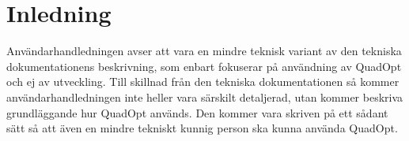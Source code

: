\section{Inledning}
Användarhandledningen avser att vara en mindre teknisk variant av den tekniska dokumentationens beskrivning, som enbart fokuserar på användning av QuadOpt och ej av utveckling. Till skillnad från den tekniska dokumentationen så kommer användarhandledningen inte heller vara särskilt detaljerad, utan kommer beskriva grundläggande hur QuadOpt används. Den kommer vara skriven på ett sådant sätt så att även en mindre tekniskt kunnig person ska kunna använda QuadOpt.